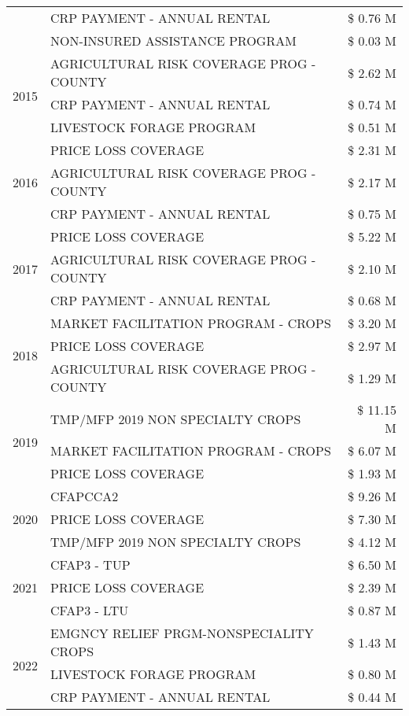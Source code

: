 \begin{tabular}{llr}
 & CRP PAYMENT - ANNUAL RENTAL & \$ 0.76 M \\
 & NON-INSURED ASSISTANCE PROGRAM & \$ 0.03 M \\
\cline{1-3}
\multirow[t]{3}{*}{2015} & AGRICULTURAL RISK COVERAGE PROG - COUNTY & \$ 2.62 M \\
 & CRP PAYMENT - ANNUAL RENTAL & \$ 0.74 M \\
 & LIVESTOCK FORAGE PROGRAM & \$ 0.51 M \\
\cline{1-3}
\multirow[t]{3}{*}{2016} & PRICE LOSS COVERAGE & \$ 2.31 M \\
 & AGRICULTURAL RISK COVERAGE PROG - COUNTY & \$ 2.17 M \\
 & CRP PAYMENT - ANNUAL RENTAL & \$ 0.75 M \\
\cline{1-3}
\multirow[t]{3}{*}{2017} & PRICE LOSS COVERAGE & \$ 5.22 M \\
 & AGRICULTURAL RISK COVERAGE PROG - COUNTY & \$ 2.10 M \\
 & CRP PAYMENT - ANNUAL RENTAL & \$ 0.68 M \\
\cline{1-3}
\multirow[t]{3}{*}{2018} & MARKET FACILITATION PROGRAM - CROPS & \$ 3.20 M \\
 & PRICE LOSS COVERAGE & \$ 2.97 M \\
 & AGRICULTURAL RISK COVERAGE PROG - COUNTY & \$ 1.29 M \\
\cline{1-3}
\multirow[t]{3}{*}{2019} & TMP/MFP 2019 NON SPECIALTY CROPS & \$ 11.15 M \\
 & MARKET FACILITATION PROGRAM - CROPS & \$ 6.07 M \\
 & PRICE LOSS COVERAGE & \$ 1.93 M \\
\cline{1-3}
\multirow[t]{3}{*}{2020} & CFAPCCA2 & \$ 9.26 M \\
 & PRICE LOSS COVERAGE & \$ 7.30 M \\
 & TMP/MFP 2019 NON SPECIALTY CROPS & \$ 4.12 M \\
\cline{1-3}
\multirow[t]{3}{*}{2021} & CFAP3 - TUP & \$ 6.50 M \\
 & PRICE LOSS COVERAGE & \$ 2.39 M \\
 & CFAP3 - LTU & \$ 0.87 M \\
\cline{1-3}
\multirow[t]{3}{*}{2022} & EMGNCY RELIEF PRGM-NONSPECIALITY CROPS & \$ 1.43 M \\
 & LIVESTOCK FORAGE PROGRAM & \$ 0.80 M \\
 & CRP PAYMENT - ANNUAL RENTAL & \$ 0.44 M \\
\cline{1-3}
\bottomrule
\end{tabular}
